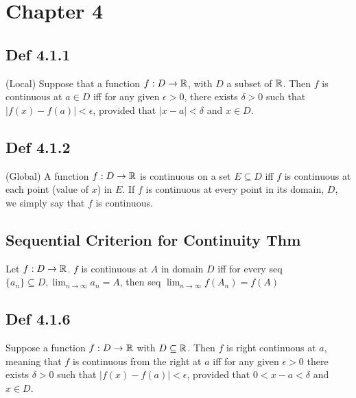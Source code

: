 \section*{Chapter 4}

\subsection*{Def 4.1.1}
    (Local) Suppose that a function $f : D \to \mathbb{R}$, with $D$ a subset of $\mathbb{R}$. Then $f$ is continuous at $a \in D$ iff for any given $\epsilon > 0$, there exists $\delta > 0$ such that $| f (x) - f (a) | < \epsilon$, provided that $|x - a| < \delta$ and $x \in D$.

\subsection*{Def 4.1.2}
    (Global) A function $f : D \to \mathbb{R}$ is continuous on a set $E \subseteq D$ iff $f$ is continuous at each point (value of $x$) in $E$. If $f$ is continuous at every point in its domain, $D$, we simply say that $f$ is continuous.

\subsection*{Sequential Criterion for Continuity Thm}
    Let $f:D \to \mathbb{R}$. $f$ is continuous at $A$ in domain $D$ iff for every seq $\{ a_n \} \subseteq D, \lim_{n \to \infty} a_n = A$, then seq $\lim_{n \to \infty} f(A_n) = f(A)$

\subsection*{Def 4.1.6}
    Suppose a function $f : D \to \mathbb{R}$ with $D \subseteq \mathbb{R}$. Then $f$ is right continuous at $a$, meaning that $f$ is continuous from the right at $a$ iff for any given $\epsilon > 0$ there exists $\delta > 0$ such that $| f (x) - f (a) | < \epsilon$, provided that $0 < x - a < \delta$ and $x \in D$.

